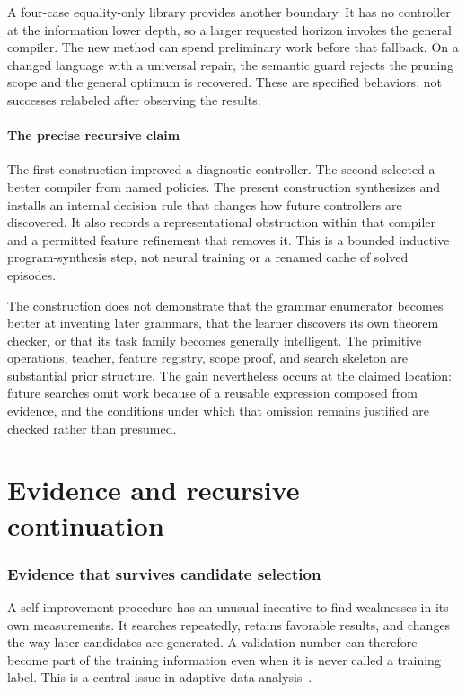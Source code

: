 \documentclass[11pt,letterpaper]{article}
\theoremstyle{plain}
\theoremstyle{definition}
\begin{document}
A four-case equality-only library provides another boundary. It has no controller at the information lower depth, so a larger requested horizon invokes the general compiler. The new method can spend preliminary work before that fallback. On a changed language with a universal repair, the semantic guard rejects the pruning scope and the general optimum is recovered. These are specified behaviors, not successes relabeled after observing the results.



\subsection{The precise recursive claim}
The first construction improved a diagnostic controller. The second selected a better compiler from named policies. The present construction synthesizes and installs an internal decision rule that changes how future controllers are discovered. It also records a representational obstruction within that compiler and a permitted feature refinement that removes it. This is a bounded inductive program-synthesis step, not neural training or a renamed cache of solved episodes.

The construction does not demonstrate that the grammar enumerator becomes better at inventing later grammars, that the learner discovers its own theorem checker, or that its task family becomes generally intelligent. The primitive operations, teacher, feature registry, scope proof, and search skeleton are substantial prior structure. The gain nevertheless occurs at the claimed location: future searches omit work because of a reusable expression composed from evidence, and the conditions under which that omission remains justified are checked rather than presumed.


\clearpage\part{Evidence and recursive continuation}
\section{Evidence that survives candidate selection}\label{sec:evidence}
A self-improvement procedure has an unusual incentive to find weaknesses in its own measurements. It searches repeatedly, retains favorable results, and changes the way later candidates are generated. A validation number can therefore become part of the training information even when it is never called a training label. This is a central issue in adaptive data analysis~\cite{dwork}.
\end{document}
